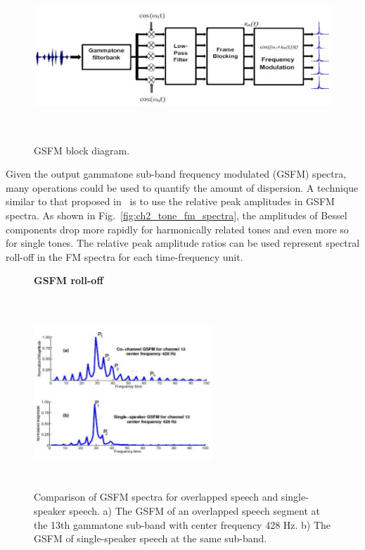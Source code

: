 {\begin{figure}[t!]
	\centering
	\hspace{-1mm}
	\includegraphics[height = 2.5in, width=1\textwidth]{figures/gsfm_block_diagram}
	\vspace{-1mm}
	\caption{ GSFM block diagram.}
	\vspace{0mm}
	\label{fig:ch2_gsfm_block_diagram}
\end{figure}

Given the output gammatone sub-band frequency modulated (GSFM) spectra, many operations could be used to quantify the amount of dispersion. 
A technique similar to that proposed in~\cite{sapvr_2000} is to use the relative peak amplitudes in GSFM spectra. 
As shown in Fig.~\ref{fig:ch2_tone_fm_spectra}, the amplitudes of Bessel components drop
more rapidly for harmonically related tones and even more so for single tones. 
The relative peak amplitude ratios can be used represent spectral roll-off in the FM spectra for each time-frequency unit. 

\begin{figure}[h!]
	\centering
	\hspace{-1mm}
	\textbf{GSFM roll-off}\par\medskip
	\includegraphics[height = 2.8in, width=0.6\textwidth]{figures/gsfm_rolloff}
	\vspace{-1mm}
	\caption{ Comparison of GSFM spectra for overlapped speech and single-speaker speech. a) The GSFM of an overlapped speech segment at the 13th gammatone sub-band with center frequency 428 Hz. b) The GSFM of single-speaker speech at the same sub-band.}
	\vspace{0mm}
	\label{fig:ch2_gsfm_rolloff}
\end{figure}

}
